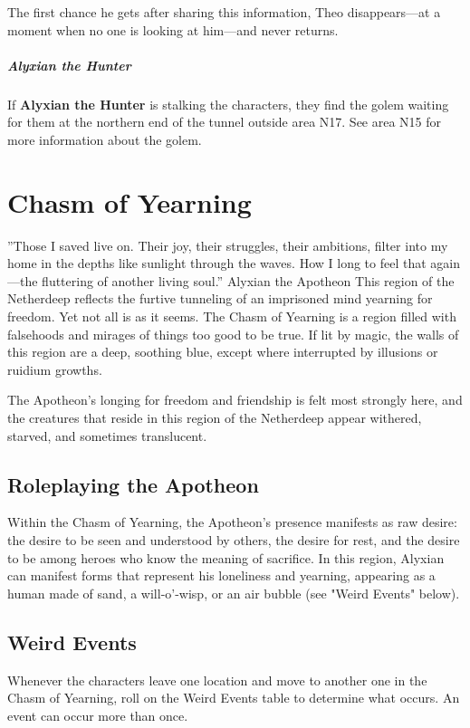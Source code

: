 \documentclass[10pt,a4paper,twoside,fancy,bg=print,twocolumn,openany,nodeprecatedcode]{dndbook}
\begin{document}
The first chance he gets after sharing this information, Theo disappears—at a moment when no one is looking at him—and never returns.

\subparagraph{Alyxian the Hunter}
If \textbf{Alyxian the Hunter} is stalking the characters, they find the golem waiting for them at the northern end of the tunnel outside area N17. See area N15 for more information about the golem.

\section{Chasm of Yearning}
\DndQuote%
{}
{''Those I saved live on. Their joy, their struggles, their ambitions, filter into my home in the depths like sunlight through the waves. How I long to feel that again—the fluttering of another living soul.''}
{Alyxian the Apotheon}
This region of the Netherdeep reflects the furtive tunneling of an imprisoned mind yearning for freedom. Yet not all is as it seems. The Chasm of Yearning is a region filled with falsehoods and mirages of things too good to be true. If lit by magic, the walls of this region are a deep, soothing blue, except where interrupted by illusions or ruidium growths.

The Apotheon's longing for freedom and friendship is felt most strongly here, and the creatures that reside in this region of the Netherdeep appear withered, starved, and sometimes translucent.

\subsection{Roleplaying the Apotheon}
Within the Chasm of Yearning, the Apotheon's presence manifests as raw desire: the desire to be seen and understood by others, the desire for rest, and the desire to be among heroes who know the meaning of sacrifice. In this region, Alyxian can manifest forms that represent his loneliness and yearning, appearing as a human made of sand, a will-o'-wisp, or an air bubble (see "Weird Events" below).

\subsection{Weird Events}
Whenever the characters leave one location and move to another one in the Chasm of Yearning, roll on the Weird Events table to determine what occurs. An event can occur more than once.
\end{document}
